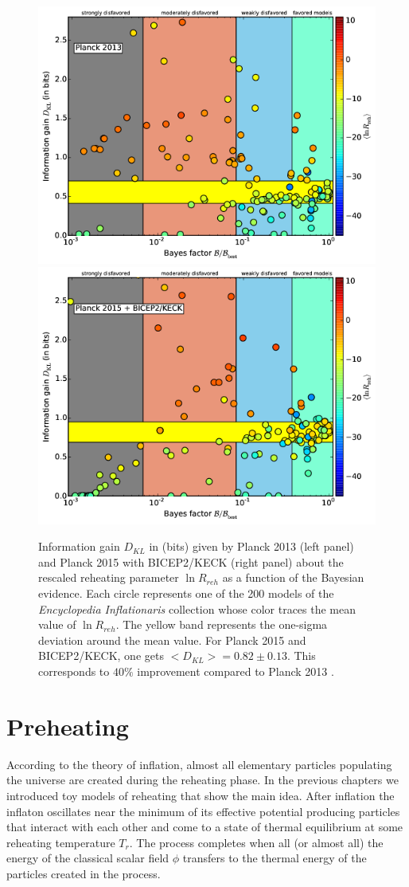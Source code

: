 \documentclass[11pt,a4paper,twoside]{book}
\begin{document}
\begin{figure}[h]
	\centering
	\includegraphics[width=0.75\linewidth, height=0.35\textheight]{Images/Chap3/Martin_Fig3A}
	\includegraphics[width=0.75\linewidth, height=0.3\textheight]{Images/Chap3/Martin_Fig3B}
	\caption{Information gain $ D_{KL} $ in (bits) given by Planck 2013 (left panel) and Planck 2015 with BICEP2/KECK (right panel) about the rescaled reheating parameter $ \ln R_{reh} $ as a function of the Bayesian evidence. Each circle represents one of the 200 models of the \textit{Encyclopedia Inflationaris} collection whose color traces the mean value of $ \ln R_{reh} $. The yellow band represents the one-sigma deviation around the mean value. For Planck 2015 and BICEP2/KECK, one gets $ <D_{KL}> = 0.82 \pm 0.13 $. This corresponds to $ 40\% $ improvement compared to Planck 2013 \cite{Chap3:Martin_Milestone}. } 
	\label{fig:martinfig3a}
\end{figure}
\chapter{Preheating}
According to the theory of inflation, almost all elementary particles populating the universe are created during the reheating phase. In the previous chapters we introduced toy models of reheating that show the main idea. After inflation the inflaton oscillates near the minimum of its effective potential producing  particles that interact with each other and come to a state of thermal equilibrium at some reheating temperature $ T_{r} $. The process completes when all (or almost all) the energy of the classical scalar field $\phi$ transfers to the thermal energy of the  particles created in the process. 
\end{document}
